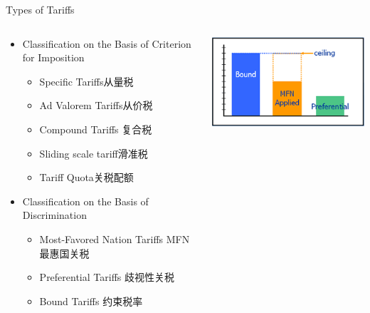 \documentclass[10pt,hyperref={CJKbookmarks=true},xcolor=dvipsnames,aspectratio=169]{beamer}
\begin{document}
\begin{frame}{Types of Tariffs}
 \begin{columns}[onlytextwidth]
 	\begin{column}{0.6\textwidth}
 	 \begin{itemize}
 		\item Classification on the Basis of Criterion for Imposition
 		\begin{itemize}
 			\item Specific Tariffs从量税
 			\item Ad Valorem Tariffs从价税
 			\item Compound Tariffs 复合税
 			\item Sliding scale tariff滑准税
 			\item Tariff Quota关税配额
 		\end{itemize}
 		\item Classification on the Basis of Discrimination
 		\begin{itemize}
 			\item Most-Favored Nation Tariffs MFN最惠国关税
 			\item Preferential Tariffs 歧视性关税
 			\item Bound Tariffs 约束税率
 		\end{itemize}
 	\end{itemize}
 \end{column}	

 	\begin{column}{0.4\textwidth}
		\includegraphics[scale=0.8]{fig/instruments/tariff}
\end{column}
 		
 \end{columns}



\end{frame}
\end{document}
